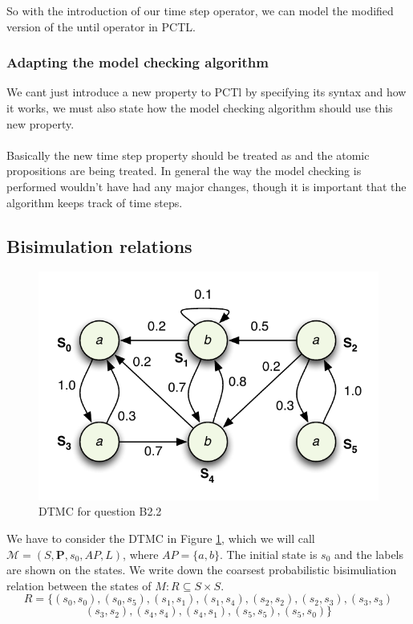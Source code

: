 \documentclass[12pt]{report}
\begin{document}
So with the introduction of our time step operator, we can model the modified version of the until operator in PCTL.

\subsubsection*{Adapting the model checking algorithm}
We cant just introduce a new property to PCTl by specifying its syntax and how it works, we must also state how the model checking algorithm should use this new property.\\
\\
Basically the new time step property should be treated as  and the atomic propositions are being treated. In general the way the model checking is performed wouldn't have had any major changes, though it is important that the algorithm keeps track of time steps.

\subsection*{Bisimulation relations}
\begin{figure}[H]
	\begin{center}
		\includegraphics[scale=.85]{../GFX/ExerciseFigure4.pdf}
	\end{center}
	\caption{DTMC for question B2.2}
	\label{fig:b22}
\end{figure}

We have to consider the DTMC in Figure \ref{fig:b22}, which we will call $\mathcal{M} = \left(S, \mathbf{P}, s_0, AP, L\right)$, where $AP = \{a,b\}$. The initial state is $s_0$ and the labels are shown on the states.
We write down the coarsest probabilistic bisimuliation relation between the states of $M: R \subseteq S \times S$.
$$R = \{ (s_0, s_0), (s_0,s_5), (s_1,s_1), (s_1,s_4),(s_2,s_2),(s_2,s_3),(s_3,s_3)$$ $$(s_3,s_2),(s_4,s_4),(s_4,s_1),(s_5,s_5),(s_5,s_0)\}$$
\end{document}
